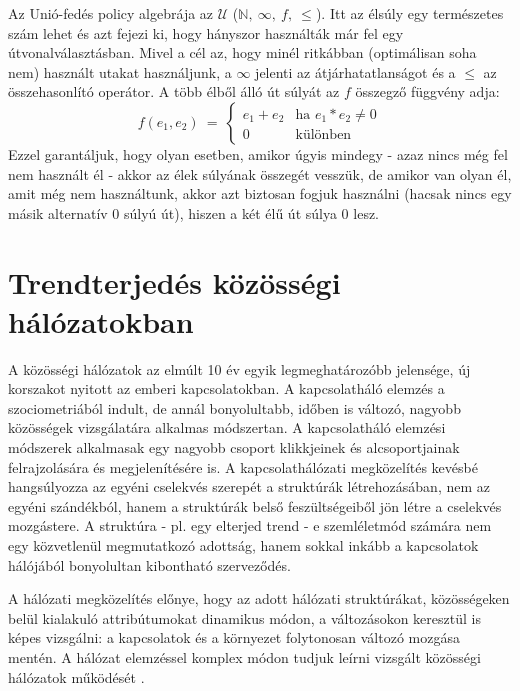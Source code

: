       Az Unió-fedés policy algebrája az $\mathcal{U}$ ($\mathbb{N},~\infty,~f,~\leq$). Itt az élsúly egy természetes szám lehet és azt fejezi ki, hogy hányszor használták már fel egy útvonalválasztásban. Mivel a cél az, hogy minél ritkábban (optimálisan soha nem) használt utakat használjunk, a $\infty$ jelenti az átjárhatatlanságot és a $\leq$ az összehasonlító operátor. A több élből álló út súlyát az $f$ összegző függvény adja:
      $$f(e_1,e_2)~=~
      \begin{cases}
        e_1+e_2 & \text{ha } e_1*e_2 \neq 0 \\
        0 & \text{különben}
      \end{cases}$$
      Ezzel garantáljuk, hogy olyan esetben, amikor úgyis mindegy - azaz nincs még fel nem használt él - akkor az élek súlyának összegét vesszük, de amikor van olyan él, amit még nem használtunk, akkor azt biztosan fogjuk használni (hacsak nincs egy másik alternatív 0 súlyú út), hiszen a két élű út súlya 0 lesz.\newpage

  \section{Trendterjedés közösségi hálózatokban}

  A közösségi hálózatok az elmúlt 10 év egyik legmeghatározóbb jelensége, új korszakot nyitott az emberi kapcsolatokban. A kapcsolatháló elemzés a szociometriából indult, de annál bonyolultabb, időben is változó, nagyobb közösségek vizsgálatára alkalmas módszertan. A kapcsolatháló elemzési módszerek alkalmasak egy nagyobb csoport klikkjeinek és alcsoportjainak felrajzolására és megjelenítésére is. A kapcsolathálózati megközelítés kevésbé hangsúlyozza az egyéni cselekvés szerepét a struktúrák létrehozásában, nem az egyéni szándékból, hanem a struktúrák belső feszültségeiből jön létre a cselekvés mozgástere. A struktúra - pl. egy elterjed trend - e szemléletmód számára nem egy közvetlenül megmutatkozó adottság, hanem sokkal inkább a kapcsolatok hálójából bonyolultan kibontható szerveződés.

  A hálózati megközelítés előnye, hogy az adott hálózati struktúrákat, közösségeken belül kialakuló attribútumokat dinamikus módon, a változásokon keresztül is képes vizsgálni: a kapcsolatok és a környezet folytonosan változó mozgása mentén. A hálózat elemzéssel komplex módon tudjuk leírni vizsgált közösségi hálózatok működését \cite{Csaba_Pal}.\\

